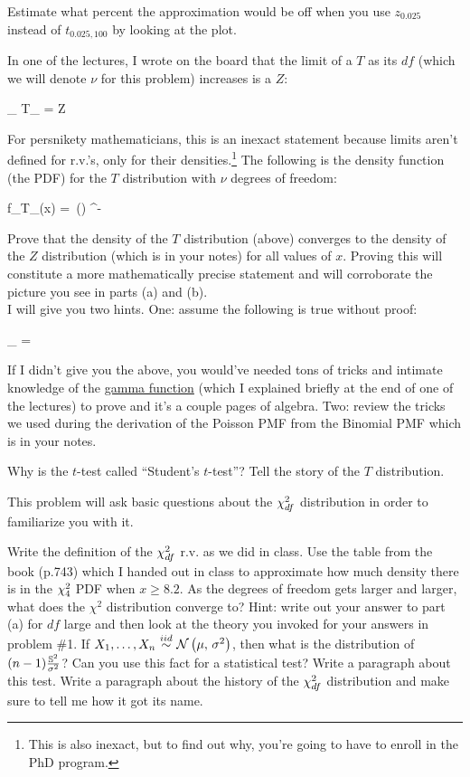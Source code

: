 \documentclass[12pt]{article}
\begin{document}
\intermediatesubproblem Estimate what percent the approximation would be off when you use $z_{0.025}$ instead of $t_{0.025, 100}$ by looking at the plot.

\extracreditsubproblem In one of the lectures, I wrote on the board that the limit of a $T$ as its $df$ (which we will denote $\nu$ for this problem) increases is a $Z$:

\beqn
\lim_{\nu \rightarrow \infty} T_{\nu} = Z
\eeqn 

For persnikety mathematicians, this is an inexact statement because limits aren't defined for r.v.'s, only for their densities.\footnote{This is also inexact, but to find out why, you're going to have to enroll in the PhD program.} The following is the density function (the PDF) for the $T$ distribution with $\nu$ degrees of freedom:

\beqn
f_{T_\nu}(x) =  {\sqrt{\nu\pi}\,\Gamma()} ^{-}
\eeqn

Prove that the density of the $T$ distribution (above) converges to the density of the $Z$ distribution (which is in your notes) for all values of $x$. Proving this will constitute a more mathematically precise statement and will corroborate the picture you see in parts (a) and (b). \\

I will give you two hints. One: assume the following is true without proof:

\beqn
\lim_{\nu \rightarrow \infty}  = 
\eeqn

If I didn't give you the above, you would've needed tons of tricks and intimate knowledge of the \href{http://en.wikipedia.org/wiki/Gamma_function}{gamma function} (which I explained briefly at the end of one of the lectures) to prove and it's a couple pages of algebra. Two: review the tricks we used during the derivation of the Poisson PMF from the Binomial PMF which is in your notes.

\extracreditsubproblem Why is the $t$-test called ``Student's $t$-test''? Tell the story of the $T$ distribution.
\eenum 


\problem This problem will ask basic questions about the $\chi^2_{df}$ distribution in order to familiarize you with it.

\benum
\easysubproblem Write the definition of the $\chi^2_{df}$ r.v. as we did in class.
\easysubproblem Use the table from the book (p.743) which I handed out in class to approximate how much density there is in the $\chi^2_{4}$ PDF when $x \geq 8.2$.
\hardsubproblem As the degrees of freedom gets larger and larger, what does the $\chi^2$ distribution converge to? Hint: write out your answer to part (a) for $df$ large and then look at the theory you invoked for your answers in problem \#1.
\easysubproblem If $\Xoneton \iid \normnot{\mu}{\sigsq}$, then what is the distribution of $(n-1)\frac{\mathbb{S}^2}{\sigma^2}$? Can you use this fact for a statistical test? Write a paragraph about this test.
\extracreditsubproblem Write a paragraph about the history of the $\chi^2_{df}$ distribution and make sure to tell me how it got its name.
\eenum
\end{document}
